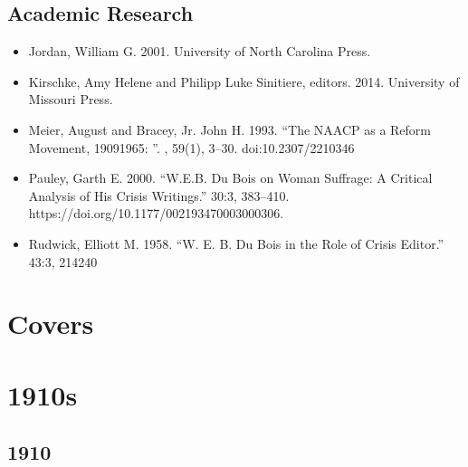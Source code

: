 \documentclass[letterpaper,10pt,english]{jupyterBook}
\begin{document}
\section{Academic Research}
\label{\detokenize{additional_resources:academic-research}}\begin{itemize}
\item {} 
\sphinxAtStartPar
Jordan, William G. 2001.  University of North Carolina Press.

\item {} 
\sphinxAtStartPar
Kirschke, Amy Helene and Philipp Luke Sinitiere, editors. 2014.  University of Missouri Press.

\item {} 
\sphinxAtStartPar
Meier, August and Bracey, Jr. John H.  1993. “The NAACP as a Reform Movement, 1909\sphinxhyphen{}1965: ”. , 59(1), 3–30. doi:10.2307/2210346

\item {} 
\sphinxAtStartPar
Pauley, Garth E. 2000. “W.E.B. Du Bois on Woman Suffrage: A Critical Analysis of His Crisis Writings.”  30:3, 383–410. https://doi.org/10.1177/002193470003000306.

\item {} 
\sphinxAtStartPar
Rudwick, Elliott M. 1958. “W. E. B. Du Bois in the Role of Crisis Editor.”  43:3, 214\sphinxhyphen{}240

\end{itemize}


\chapter{Covers}
\label{\detokenize{covers:covers}}\label{\detokenize{covers::doc}}

\chapter{1910s}
\label{\detokenize{covers:s}}

\section{1910}
\label{\detokenize{covers:id1}}
\sphinxAtStartPar
{}
\end{document}
